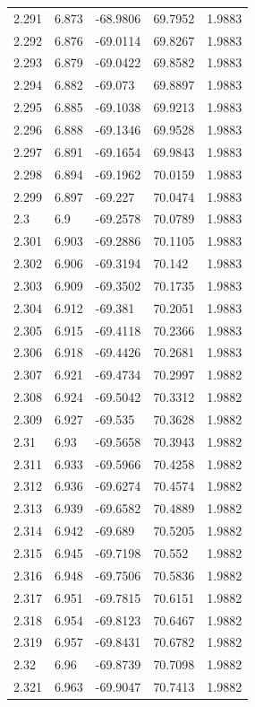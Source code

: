 \begin{tabular}{lllll}
2.291 & 6.873 & -68.9806 & 69.7952 & 1.9883 \\
2.292 & 6.876 & -69.0114 & 69.8267 & 1.9883 \\
2.293 & 6.879 & -69.0422 & 69.8582 & 1.9883 \\
2.294 & 6.882 & -69.073 & 69.8897 & 1.9883 \\
2.295 & 6.885 & -69.1038 & 69.9213 & 1.9883 \\
2.296 & 6.888 & -69.1346 & 69.9528 & 1.9883 \\
2.297 & 6.891 & -69.1654 & 69.9843 & 1.9883 \\
2.298 & 6.894 & -69.1962 & 70.0159 & 1.9883 \\
2.299 & 6.897 & -69.227 & 70.0474 & 1.9883 \\
2.3 & 6.9 & -69.2578 & 70.0789 & 1.9883 \\
2.301 & 6.903 & -69.2886 & 70.1105 & 1.9883 \\
2.302 & 6.906 & -69.3194 & 70.142 & 1.9883 \\
2.303 & 6.909 & -69.3502 & 70.1735 & 1.9883 \\
2.304 & 6.912 & -69.381 & 70.2051 & 1.9883 \\
2.305 & 6.915 & -69.4118 & 70.2366 & 1.9883 \\
2.306 & 6.918 & -69.4426 & 70.2681 & 1.9883 \\
2.307 & 6.921 & -69.4734 & 70.2997 & 1.9882 \\
2.308 & 6.924 & -69.5042 & 70.3312 & 1.9882 \\
2.309 & 6.927 & -69.535 & 70.3628 & 1.9882 \\
2.31 & 6.93 & -69.5658 & 70.3943 & 1.9882 \\
2.311 & 6.933 & -69.5966 & 70.4258 & 1.9882 \\
2.312 & 6.936 & -69.6274 & 70.4574 & 1.9882 \\
2.313 & 6.939 & -69.6582 & 70.4889 & 1.9882 \\
2.314 & 6.942 & -69.689 & 70.5205 & 1.9882 \\
2.315 & 6.945 & -69.7198 & 70.552 & 1.9882 \\
2.316 & 6.948 & -69.7506 & 70.5836 & 1.9882 \\
2.317 & 6.951 & -69.7815 & 70.6151 & 1.9882 \\
2.318 & 6.954 & -69.8123 & 70.6467 & 1.9882 \\
2.319 & 6.957 & -69.8431 & 70.6782 & 1.9882 \\
2.32 & 6.96 & -69.8739 & 70.7098 & 1.9882 \\
2.321 & 6.963 & -69.9047 & 70.7413 & 1.9882 \\

\end{tabular}
